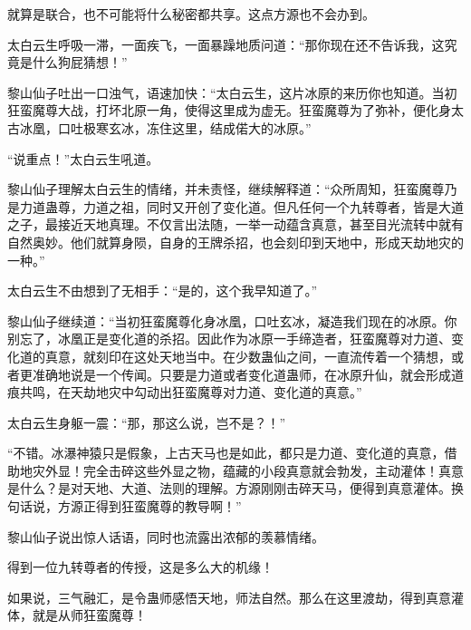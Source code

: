 \begin{this_body}
就算是联合，也不可能将什么秘密都共享。这点方源也不会办到。

太白云生呼吸一滞，一面疾飞，一面暴躁地质问道：“那你现在还不告诉我，这究竟是什么狗屁猜想！”

黎山仙子吐出一口浊气，语速加快：“太白云生，这片冰原的来历你也知道。当初狂蛮魔尊大战，打坏北原一角，使得这里成为虚无。狂蛮魔尊为了弥补，便化身太古冰凰，口吐极寒玄冰，冻住这里，结成偌大的冰原。”

“说重点！”太白云生吼道。

黎山仙子理解太白云生的情绪，并未责怪，继续解释道：“众所周知，狂蛮魔尊乃是力道蛊尊，力道之祖，同时又开创了变化道。但凡任何一个九转尊者，皆是大道之子，最接近天地真理。不仅言出法随，一举一动蕴含真意，甚至目光流转中就有自然奥妙。他们就算身陨，自身的王牌杀招，也会刻印到天地中，形成天劫地灾的一种。”

太白云生不由想到了无相手：“是的，这个我早知道了。”

黎山仙子继续道：“当初狂蛮魔尊化身冰凰，口吐玄冰，凝造我们现在的冰原。你别忘了，冰凰正是变化道的杀招。因此作为冰原一手缔造者，狂蛮魔尊对力道、变化道的真意，就刻印在这处天地当中。在少数蛊仙之间，一直流传着一个猜想，或者更准确地说是一个传闻。只要是力道或者变化道蛊师，在冰原升仙，就会形成道痕共鸣，在天劫地灾中勾动出狂蛮魔尊对力道、变化道的真意。”

太白云生身躯一震：“那，那这么说，岂不是？！”

“不错。冰瀑神猿只是假象，上古天马也是如此，都只是力道、变化道的真意，借助地灾外显！完全击碎这些外显之物，蕴藏的小段真意就会勃发，主动灌体！真意是什么？是对天地、大道、法则的理解。方源刚刚击碎天马，便得到真意灌体。换句话说，方源正得到狂蛮魔尊的教导啊！”

黎山仙子说出惊人话语，同时也流露出浓郁的羡慕情绪。

得到一位九转尊者的传授，这是多么大的机缘！

如果说，三气融汇，是令蛊师感悟天地，师法自然。那么在这里渡劫，得到真意灌体，就是从师狂蛮魔尊！

\end{this_body}


